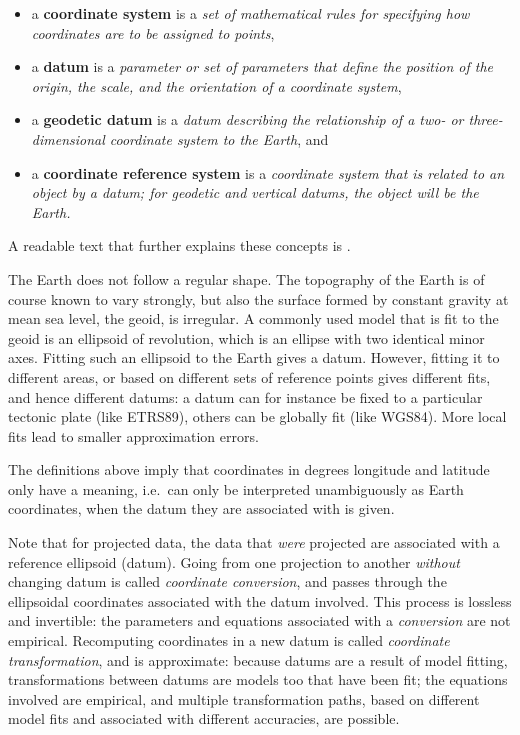 \documentclass[]{book}
\providecommand{\tightlist}{%
  \setlength{\itemsep}{0pt}\setlength{\parskip}{0pt}}
\begin{document}
\begin{itemize}
\tightlist
\item
  a \textbf{coordinate system} is a \emph{set of mathematical rules for specifying how coordinates are to be assigned to points},
\item
  a \textbf{datum} is a \emph{parameter or set of parameters that define the position of the origin, the scale, and the orientation of a coordinate system},
\item
  a \textbf{geodetic datum} is a \emph{datum describing the relationship of a two- or three-dimensional coordinate system to the Earth}, and
\item
  a \textbf{coordinate reference system} is a \emph{coordinate system that is related to an object by a datum; for geodetic and vertical datums, the object will be the Earth.}
\end{itemize}

A readable text that further explains these concepts is \citet{iliffelott}.

The Earth does not follow a regular shape. The topography of the
Earth is of course known to vary strongly, but also the surface
formed by constant gravity at mean sea level, the geoid, is
irregular. A commonly used model that is fit to the geoid is an
ellipsoid of revolution, which is an ellipse with two identical
minor axes. Fitting such an ellipsoid to the Earth gives a datum.
However, fitting it to different areas, or based on different sets of
reference points gives different fits, and hence different datums:
a datum can for instance be fixed to a particular tectonic plate
(like ETRS89), others can be globally fit (like WGS84). More local
fits lead to smaller approximation errors.

The definitions above imply that coordinates in degrees longitude
and latitude only have a meaning, i.e.~can only be interpreted
unambiguously as Earth coordinates, when the datum they are
associated with is given.

Note that for projected data, the data that \emph{were} projected
are associated with a reference ellipsoid (datum). Going from
one projection to another \emph{without} changing datum is called
\emph{coordinate conversion}, and passes through the ellipsoidal
coordinates associated with the datum involved. This process is
lossless and invertible: the parameters and equations associated
with a \emph{conversion} are not empirical. Recomputing coordinates in a
new datum is called \emph{coordinate transformation}, and is approximate:
because datums are a result of model fitting, transformations
between datums are models too that have been fit; the equations
involved are empirical, and multiple transformation paths, based
on different model fits and associated with different accuracies,
are possible.
\end{document}

